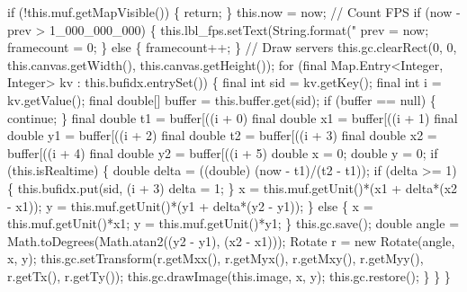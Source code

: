     if (!this.muf.getMapVisible()) \{
      return;
    \}
    this.now = now;
    // Count FPS
    if (now - prev > 1_000_000_000) \{
      this.lbl_fps.setText(String.format("%
      prev = now;
      framecount = 0;
    \} else \{
      framecount++;
    \}
    // Draw servers
    this.gc.clearRect(0, 0, this.canvas.getWidth(), this.canvas.getHeight());
    for (final Map.Entry<Integer, Integer> kv : this.bufidx.entrySet()) \{
      final int sid = kv.getKey();
      final int i = kv.getValue();
      final double[] buffer = this.buffer.get(sid);
      if (buffer == null) \{
        continue;
      \}
      final double t1 = buffer[((i + 0) %
      final double x1 = buffer[((i + 1) %
      final double y1 = buffer[((i + 2) %
      final double t2 = buffer[((i + 3) %
      final double x2 = buffer[((i + 4) %
      final double y2 = buffer[((i + 5) %
      double x = 0;
      double y = 0;
      if (this.isRealtime) \{
        double delta = ((double) (now - t1)/(t2 - t1));
        if (delta >= 1) \{
          this.bufidx.put(sid, (i + 3) %
          delta = 1;
        \}
        x = this.muf.getUnit()*(x1 + delta*(x2 - x1));
        y = this.muf.getUnit()*(y1 + delta*(y2 - y1));
      \} else \{
        x = this.muf.getUnit()*x1;
        y = this.muf.getUnit()*y1;
      \}
      this.gc.save();
      double angle = Math.toDegrees(Math.atan2((y2 - y1), (x2 - x1)));
      Rotate r = new Rotate(angle, x, y);
      this.gc.setTransform(r.getMxx(), r.getMyx(), r.getMxy(), r.getMyy(), r.getTx(), r.getTy());
      this.gc.drawImage(this.image, x, y);
      this.gc.restore();
    \}
  \}
\}
\nwendcode{}\nwdocspar

